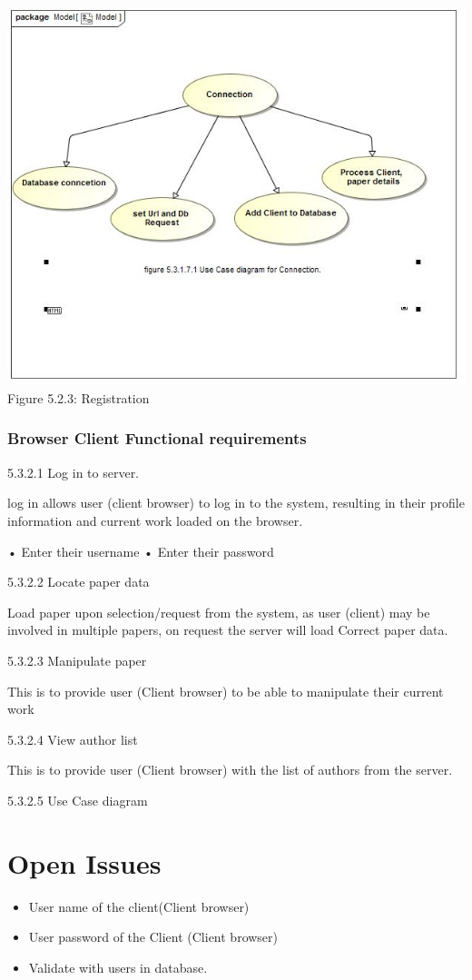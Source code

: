 \documentclass[hidelinks,a4paper,12pt]{article}
\begin{document}
	\includegraphics[width=1\textwidth]{./UseCaseforConnection.jpg}\\[0.4cm]
	
		Figure 5.2.3: Registration
		
		
		
		
		
		
			\subsubsection{Browser Client Functional requirements}
		
		5.3.2.1 Log in to server.
		
		log in allows user (client browser) to log in to the system, resulting 
		in their profile information and current work loaded on the browser.  
		
		•	Enter their username
		•	Enter their password
		
		5.3.2.2 Locate paper data
		
		Load paper upon selection/request from the system, as user (client)  
		may be involved in multiple papers, on request the server will load 
		Correct paper data. 
		
		
		5.3.2.3 Manipulate paper 
		
		This is to provide user (Client browser) to be able to manipulate their current work  	
		
		5.3.2.4 View author list
		
		This is to provide user (Client browser) with the list of authors from the server.
		
		5.3.2.5 Use Case diagram
	
	
	\section{Open Issues}
	\begin{itemize}
		\item User name of the client(Client browser)
		\item User password of the Client (Client browser)
		\item Validate with users in database. 
	\end{itemize}
	
	
	
	
\end{document}
